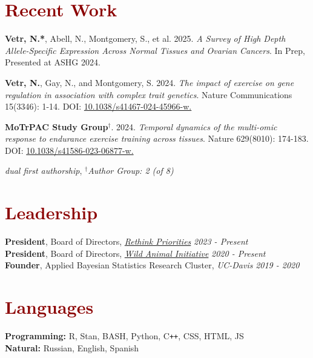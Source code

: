 \documentclass[11pt,margin,line]{resume}
\begin{document}
\begin{resume}
\section{\large\textcolor{DarkRed}{Recent Work}}

\textbf{Vetr, N.*}, Abell, N., Montgomery, S., et al.  2025.  \emph{A Survey of High Depth Allele-Specific Expression Across Normal Tissues and Ovarian Cancers}.  In Prep, Presented at ASHG 2024.

\textbf{Vetr, N.},  Gay,  N.,  and Montgomery,  S.  2024.  \emph{The impact of exercise on gene regulation in association with complex trait genetics}.  Nature Communications 15(3346): 1-14. DOI: \href{https://doi.org/10.1038/s41467-024-45966-w}{\color{blue}10.1038/s41467-024-45966-w.}

\textbf{MoTrPAC Study Group}$^{\dag}$. 2024.  \emph{Temporal dynamics of the multi-omic response to endurance exercise training across tissues}.  Nature 629(8010): 174-183. DOI: \href{https://doi.org/10.1038/s41586-023-06877-w}{\color{blue}10.1038/s41586-023-06877-w.}

\vspace{-1.5mm}
{\hfill\small*\textit{dual first authorship}, $^{\dag}$\textit{Author Group: 2 (of 8)}}

\vspace{-1.5mm}
\section{\large\textcolor{DarkRed}{Leadership}}
\textbf{President}, Board of Directors, \textit{\href{https://rethinkpriorities.org/}{Rethink Priorities}} \hfill \emph{2023 - Present}\\
\textbf{President}, Board of Directors, \textit{\href{https://www.wildanimalinitiative.org/}{Wild Animal Initiative}} \hfill \emph{2020 - Present}\\
\textbf{Founder}, Applied Bayesian Statistics Research Cluster, \textit{UC-Davis} \hfill \emph{2019 - 2020}\\

\vspace{-5mm}
\section{\large\textcolor{DarkRed}{Languages}}
\textbf{Programming:} R, Stan, BASH, Python, C\texttt{\texttt{+}\texttt{+}}, CSS, HTML, JS\\
\textbf{Natural:} Russian, English, Spanish


\end{resume}
\end{document}
